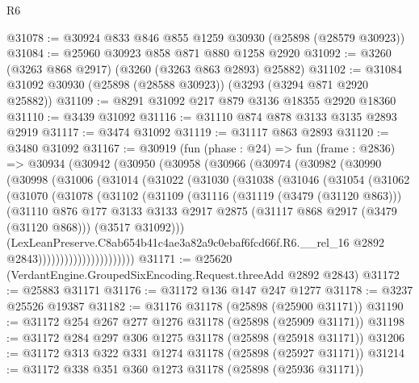 \begin{lexlean}{R6}
\begin{coremodule}
@31078 := @30924 @833 @846 @855 @1259 @30930 (@25898 (@28579 @30923))
@31084 := @25960 @30923 @858 @871 @880 @1258 @2920
@31092 := @3260 (@3263 @868 @2917) (@3260 (@3263 @863 @2893) @25882)
@31102 := @31084 @31092 @30930 (@25898 (@28588 @30923)) (@3293 (@3294 @871 @2920 @25882))
@31109 := @8291 @31092 @217 @879 @3136 @18355 @2920 @18360
@31110 := @3439 @31092
@31116 := @31110 @874 @878 @3133 @3135 @2893 @2919
@31117 := @3474 @31092
@31119 := @31117 @863 @2893
@31120 := @3480 @31092
@31167 := @30919
    (fun (phase : @24) =>
    fun (frame : @2836) =>
    @30934
      (@30942
        (@30950
          (@30958
            (@30966
              (@30974
                (@30982
                  (@30990
                    (@30998
                      (@31006
                        (@31014
                          (@31022
                            (@31030
                              (@31038
                                (@31046
                                  (@31054
                                    (@31062
                                      (@31070
                                        (@31078
                                          (@31102
                                            (@31109
                                              (@31116
                                                (@31119 (@3479 (@31120 @863)))
                                                (@31110
                                                  @876
                                                  @177
                                                  @3133
                                                  @3133
                                                  @2917
                                                  @2875
                                                  (@31117 @868 @2917 (@3479 (@31120 @868)))
                                                  (@3517 @31092)))
                                              (LexLeanPreserve.C8ab654b41c4ae3a82a9c0ebaf6fcd66f.R6.__rel_16
                                                @2892
                                                @2843))))))))))))))))))))))
@31171 := @25620 (VerdantEngine.GroupedSixEncoding.Request.threeAdd @2892 @2843)
@31172 := @25883 @31171
@31176 := @31172 @136 @147 @247 @1277
@31178 := @3237 @25526 @19387
@31182 := @31176 @31178 (@25898 (@25900 @31171))
@31190 := @31172 @254 @267 @277 @1276 @31178 (@25898 (@25909 @31171))
@31198 := @31172 @284 @297 @306 @1275 @31178 (@25898 (@25918 @31171))
@31206 := @31172 @313 @322 @331 @1274 @31178 (@25898 (@25927 @31171))
@31214 := @31172 @338 @351 @360 @1273 @31178 (@25898 (@25936 @31171))

\end{coremodule}
\end{lexlean}
